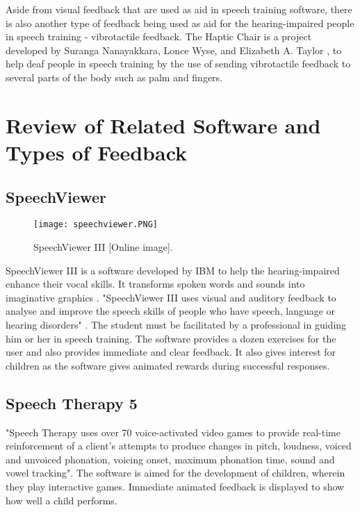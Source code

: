Aside from visual feedback that are used as aid in speech training software, there is also another type of feedback being used as aid for the hearing-impaired people in speech training - vibrotactile feedback. The Haptic Chair is a project developed by Suranga Nanayakkara, Lonce Wyse, and Elizabeth A. Taylor \citeyear{nanaya:2012:hap}, to help deaf people in speech training by the use of sending vibrotactile feedback to several parts of the body such as palm and fingers.

\pagebreak
\section{Review of Related Software and Types of Feedback}

\subsection{SpeechViewer}

\begin{figure}[h]
    \centering
    \texttt{[image: speechviewer.PNG]}
    \caption{SpeechViewer III [Online image].}
    \cite{speechviewer3:img}
    \label{fig:speechviewer}
\end{figure}

SpeechViewer III is a software developed by IBM to help the hearing-impaired enhance their vocal skills. It transforms spoken words and sounds into imaginative graphics \cite{speechville:2014:slp}. "SpeechViewer III uses visual and auditory feedback to analyse and improve the speech skills of people who have speech, language or hearing disorders" \cite{kennedy:1998:spv}. The student must be facilitated by a professional in guiding him or her in speech training. The software provides a dozen exercises for the user and also provides immediate and clear feedback. It also gives interest for children as the software gives animated rewards during successful responses.

\subsection{Speech Therapy 5}
"Speech Therapy uses over 70 voice-activated video games to provide real-time reinforcement of a client's attempts to produce changes in pitch, loudness, voiced and unvoiced phonation, voicing onset, maximum phonation time, sound and vowel tracking"\cite{drspeech:1998:st5}. The software is aimed for the development of children, wherein they play interactive games. Immediate animated feedback is displayed to show how well a child performs.


